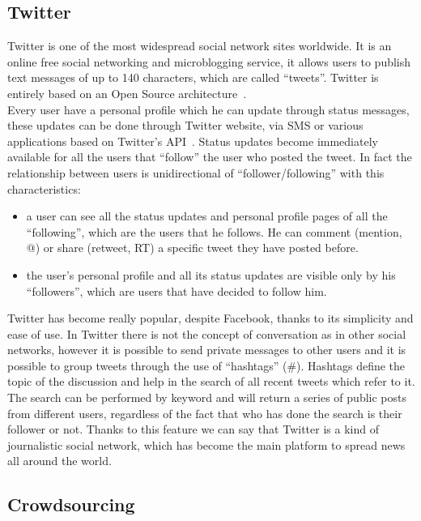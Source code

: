 \subsection{Twitter}
\noindent Twitter is one of the most widespread social network sites worldwide. It is an online free social networking and microblogging service, it allows users to publish text messages of up to 140 characters, which are called ``tweets''. Twitter is entirely based on an Open Source architecture~\cite{twitteropensource}.
\\
\noindent Every user have a personal profile which he can update through status messages, these updates can be done through Twitter website, via SMS or various applications based on Twitter's API~\cite{twitterapi}. Status updates become immediately available for all the users that ``follow'' the user who posted the tweet. In fact the relationship between users is unidirectional of ``follower/following'' with this characteristics:

\begin{itemize}
    \item a user can see all the status updates and personal profile pages of all the ``following'', which are the users that he follows. He can comment (mention, @) or share (retweet, RT) a specific tweet they have posted before.
    \item the user's personal profile and all its status updates are visible only by his ``followers'', which are users that have decided to follow him.
\end{itemize}

\noindent Twitter has become really popular, despite Facebook, thanks to its simplicity and ease of use. In Twitter there is not the concept of conversation as in other social networks, however it is possible to send private messages to other users and it is possible to group tweets through the use of ``hashtags'' (\#). Hashtags define the topic of the discussion and help in the search of all recent tweets which refer to it.
The search can be performed by keyword and will return a series of public posts from different users, regardless of the fact that who has done the search is their follower or not. Thanks to this feature we can say that Twitter is a kind of journalistic social network, which has become the main platform to spread news all around the world.

\subsection{Crowdsourcing}

